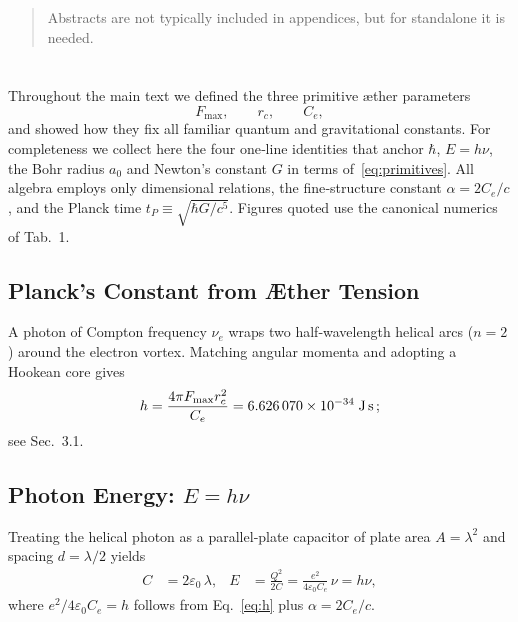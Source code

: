 \documentclass[12pt]{article}
\begin{document}
  \titlepageOpen

  \begin{abstract}
      Abstracts are not typically included in appendices, but for standalone it is needed.
  \end{abstract}

  \titlepageClose
\fi

\section{\appendixtitle}
    Throughout the main text we defined the three primitive æther parameters
    \begin{equation}
    F_{\max}, \qquad r_c, \qquad C_e,
    \label{eq:primitives}
    \end{equation}
    and showed how they fix all familiar quantum and gravitational constants.
    For completeness we collect here the four one‑line identities that anchor
    \(\hbar\), \(E=h\nu\), the Bohr radius \(a_0\) and Newton's constant \(G\)
    in terms of~\eqref{eq:primitives}.
    All algebra employs only dimensional relations, the fine‑structure constant
    \(\alpha=2C_e/c\), and the Planck time
    \(t_P\equiv\sqrt{\hbar G/c^{5}}\). Figures quoted use the canonical
    numerics of Tab.~1.

    \subsection{Planck's Constant from Æther Tension}
    A photon of Compton frequency \(\nu_e\) wraps two half‑wavelength
    helical arcs (\(n=2\)) around the electron vortex. Matching
    angular momenta and adopting a Hookean core gives
    \begin{equation}
        h = \frac{4\pi F_{\max} r_c^{2}}{C_e}
        = 6.626\,070\times10^{-34}\;\text{J\,s}\,;
        \label{eq:h}
    \end{equation}
    see Sec.~3.1.

    \subsection{Photon Energy: \(E=h\nu\)}
    Treating the helical photon as a parallel‑plate capacitor of plate area
    \(A=\lambda^{2}\) and spacing \(d=\lambda/2\) yields
    \begin{align}
        C &= 2\varepsilon_0\,\lambda, &
        E &= \frac{Q^{2}}{2C} = \frac{e^{2}}{4\varepsilon_{0}C_e}\,\nu
        = h\nu,
        \label{eq:Einstein}
    \end{align}
    where \(e^{2}/4\varepsilon_{0}C_e=h\) follows from Eq.~\eqref{eq:h} plus
    \(\alpha=2C_e/c\).
\end{document}
